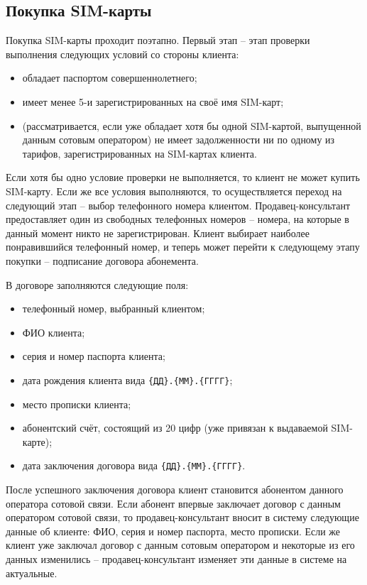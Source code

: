 \subsection{Покупка SIM-карты}


Покупка SIM-карты проходит поэтапно. Первый этап -- этап проверки выполнения следующих условий со стороны клиента:
\begin{itemize}
    \item обладает паспортом совершеннолетнего;
    \item имеет менее 5-и зарегистрированных на своё имя SIM-карт;
    \item (рассматривается, если уже обладает хотя бы одной SIM-картой, выпущенной данным сотовым оператором) не имеет задолженности ни по одному из тарифов, зарегистрированных на SIM-картах клиента.
\end{itemize}

Если хотя бы одно условие проверки не выполняется, то клиент не может купить SIM-карту. Если же все условия выполняются, то осуществляется переход на следующий этап -- выбор телефонного номера клиентом. Продавец-консультант предоставляет один из свободных телефонных номеров -- номера, на которые в данный момент никто не зарегистрирован. Клиент выбирает наиболее понравившийся телефонный номер, и теперь может перейти к следующему этапу покупки -- подписание договора абонемента.

В договоре заполняются следующие поля:
\begin{itemize}
    \item телефонный номер, выбранный клиентом;
    \item ФИО клиента;
    \item серия и номер паспорта клиента;
    \item дата рождения клиента вида \texttt{\{ДД\}.\{ММ\}.\{ГГГГ\}};
    \item место прописки клиента;
    \item абонентский счёт, состоящий из 20 цифр (уже привязан к выдаваемой SIM-карте);
    \item дата заключения договора вида \texttt{\{ДД\}.\{ММ\}.\{ГГГГ\}}.
\end{itemize}

После успешного заключения договора клиент становится абонентом данного оператора сотовой связи. Если абонент впервые заключает договор с данным оператором сотовой связи, то продавец-консультант вносит в систему следующие данные об клиенте: ФИО, серия и номер паспорта, место прописки. Если же клиент уже заключал договор с данным сотовым оператором и некоторые из его данных изменились -- продавец-консультант изменяет эти данные в системе на актуальные.

